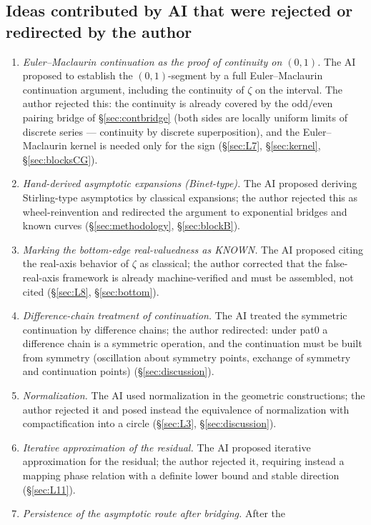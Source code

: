 \documentclass{article}
\newcommand{\zt}{\zeta}
\begin{document}
\subsection*{Ideas contributed by AI that were rejected or redirected by the author}
\begin{enumerate}
\item \emph{Euler--Maclaurin continuation as the proof of continuity on
$(0,1)$.} The AI proposed to establish the $(0,1)$-segment by a full
Euler--Maclaurin continuation argument, including the continuity of $\zt$ on
the interval. The author rejected this: the continuity is already covered by
the odd/even pairing bridge of \S\ref{sec:contbridge} (both sides are
locally uniform limits of discrete series --- continuity by discrete
superposition), and the Euler--Maclaurin kernel is needed only for the sign
(\S\ref{sec:L7}, \S\ref{sec:kernel}, \S\ref{sec:blocksCG}).
\item \emph{Hand-derived asymptotic expansions (Binet-type).} The AI
proposed deriving Stirling-type asymptotics by classical expansions; the
author rejected this as wheel-reinvention and redirected the argument to
exponential bridges and known curves (\S\ref{sec:methodology},
\S\ref{sec:blockB}).
\item \emph{Marking the bottom-edge real-valuedness as KNOWN.} The AI
proposed citing the real-axis behavior of $\zt$ as classical; the author
corrected that the false-real-axis framework is already machine-verified and
must be assembled, not cited (\S\ref{sec:L8}, \S\ref{sec:bottom}).
\item \emph{Difference-chain treatment of continuation.} The AI treated the
symmetric continuation by difference chains; the author redirected: under
pat0 a difference chain is a symmetric operation, and the continuation must
be built from symmetry (oscillation about symmetry points, exchange of
symmetry and continuation points) (\S\ref{sec:discussion}).
\item \emph{Normalization.} The AI used normalization in the geometric
constructions; the author rejected it and posed instead the equivalence of
normalization with compactification into a circle (\S\ref{sec:L3},
\S\ref{sec:discussion}).
\item \emph{Iterative approximation of the residual.} The AI proposed
iterative approximation for the residual; the author rejected it, requiring
instead a mapping phase relation with a definite lower bound and stable
direction (\S\ref{sec:L11}).
\item \emph{Persistence of the asymptotic route after bridging.} After the

\end{enumerate}
\end{document}

